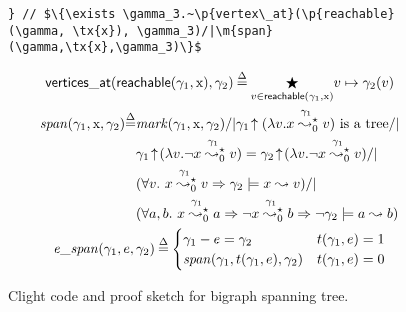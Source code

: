 \begin{figure}[t]
\begin{lstlisting}
} // $\{\exists \gamma_3.~\p{vertex\_at}(\p{reachable}(\gamma, \tx{x}), \gamma_3)/|\m{span}(\gamma,\tx{x},\gamma_3)\}$
  \end{lstlisting}
  \small
\begin{gather*}
  \p{vertices\_at}(\p{reachable}(\gamma_1, \tx x), \gamma_2)\defeq \underset{v\in\p{reachable}(\gamma_1, \tx x)}{\bigstar}v \mapsto \gamma_2(v)\\
  \begin{split}
  \m{span}(\gamma_1, \tx x, \gamma_2)\defeq &\m{mark}(\gamma_1,\tx x, \gamma_2) /| \gamma_1\!\uparrow(\lambda v. x\mathrel{{\stackrel{\gamma_1~}{\leadsto^{\star}_{0}}}} v) \text{ is a tree} /| \null\\
  & \gamma_1\!\uparrow\!(\lambda v.\neg x\mathrel{{\stackrel{\gamma_1~}{\leadsto^{\star}_{0}}}} v) = \gamma_2\!\uparrow\!(\lambda v.\neg x\mathrel{{\stackrel{\gamma_1~}{\leadsto^{\star}_{0}}}} v) /| \null\\
  & (\forall v.~x\mathrel{{\stackrel{\gamma_1~}{\leadsto^{\star}_{0}}}} v => \gamma_2\models x \leadsto v) /| \null\\
  & (\forall a,b.~x\mathrel{{\stackrel{\gamma_1~}{\leadsto^{\star}_{0}}}} a => \neg x\mathrel{{\stackrel{\gamma_1~}{\leadsto^{\star}_{0}}}} b => \neg \gamma_2\models a \leadsto b)\\
  \end{split}\\
  \m{e\_span}(\gamma_1, e, \gamma_2)\defeq
  \begin{cases}
    \gamma_1 - e = \gamma_2  & t(\gamma_1,e)=1\\
    \m{span}(\gamma_1, t(\gamma_1,e), \gamma_2) & t(\gamma_1,e)=0\\
  \end{cases}
\end{gather*}
\caption{Clight code and proof sketch for bigraph spanning tree.}
\label{fig:spanning}

\end{figure}
